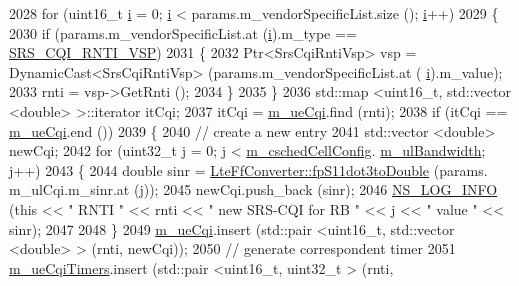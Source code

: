 \begin{DoxyCode}
2028         \textcolor{keywordflow}{for} (uint16\_t \hyperlink{bernuolliDistribution_8m_a6f6ccfcf58b31cb6412107d9d5281426}{i} = 0; \hyperlink{bernuolliDistribution_8m_a6f6ccfcf58b31cb6412107d9d5281426}{i} < params.m\_vendorSpecificList.size (); \hyperlink{bernuolliDistribution_8m_a6f6ccfcf58b31cb6412107d9d5281426}{i}++)
2029           \{
2030             \textcolor{keywordflow}{if} (params.m\_vendorSpecificList.at (\hyperlink{bernuolliDistribution_8m_a6f6ccfcf58b31cb6412107d9d5281426}{i}).m\_type == \hyperlink{lte-vendor-specific-parameters_8h_a3b5e6e766032ab4a8e374a1cfd237a26}{SRS\_CQI\_RNTI\_VSP})
2031               \{
2032                 Ptr<SrsCqiRntiVsp> vsp = DynamicCast<SrsCqiRntiVsp> (params.m\_vendorSpecificList.at (
      \hyperlink{bernuolliDistribution_8m_a6f6ccfcf58b31cb6412107d9d5281426}{i}).m\_value);
2033                 rnti = vsp->GetRnti ();
2034               \}
2035           \}
2036         std::map <uint16\_t, std::vector <double> >::iterator itCqi;
2037         itCqi = \hyperlink{classns3_1_1TdTbfqFfMacScheduler_a5cf85878fa75fd31bdc63527492e9270}{m\_ueCqi}.find (rnti);
2038         \textcolor{keywordflow}{if} (itCqi == \hyperlink{classns3_1_1TdTbfqFfMacScheduler_a5cf85878fa75fd31bdc63527492e9270}{m\_ueCqi}.end ())
2039           \{
2040             \textcolor{comment}{// create a new entry}
2041             std::vector <double> newCqi;
2042             \textcolor{keywordflow}{for} (uint32\_t j = 0; j < \hyperlink{classns3_1_1TdTbfqFfMacScheduler_a3ac3e4b1b3818ff204d6ff6c89c19f4d}{m\_cschedCellConfig}.
      \hyperlink{structns3_1_1FfMacCschedSapProvider_1_1CschedCellConfigReqParameters_a5ab5b102878e6e7e7727a14af4a64d2f}{m\_ulBandwidth}; j++)
2043               \{
2044                 \textcolor{keywordtype}{double} sinr = \hyperlink{classns3_1_1LteFfConverter_aa5d8c2a8f988dbd63da91818c18666eb}{LteFfConverter::fpS11dot3toDouble} (params.
      m\_ulCqi.m\_sinr.at (j));
2045                 newCqi.push\_back (sinr);
2046                 \hyperlink{group__logging_gafbd73ee2cf9f26b319f49086d8e860fb}{NS\_LOG\_INFO} (\textcolor{keyword}{this} << \textcolor{stringliteral}{" RNTI "} << rnti << \textcolor{stringliteral}{" new SRS-CQI for RB  "} << j << \textcolor{stringliteral}{" value
       "} << sinr);
2047 
2048               \}
2049             \hyperlink{classns3_1_1TdTbfqFfMacScheduler_a5cf85878fa75fd31bdc63527492e9270}{m\_ueCqi}.insert (std::pair <uint16\_t, std::vector <double> > (rnti, newCqi));
2050             \textcolor{comment}{// generate correspondent timer}
2051             \hyperlink{classns3_1_1TdTbfqFfMacScheduler_abc6132bce28b1ee650503bf3144eb22a}{m\_ueCqiTimers}.insert (std::pair <uint16\_t, uint32\_t > (rnti, 

\end{DoxyCode}
